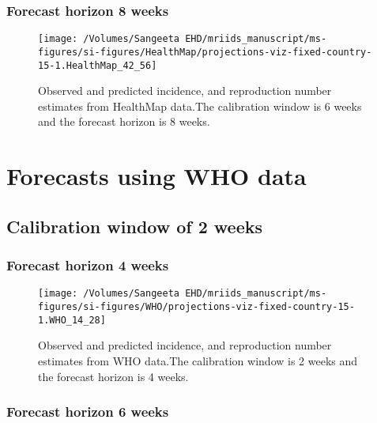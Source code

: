 \documentclass[9pt,twoside,lineno]{pnas-new}
\begin{document}
\hypertarget{forecast-horizon-8-weeks-5}{%
  \subsubsection{Forecast horizon 8 weeks}\label{forecast-horizon-8-weeks-5}}

\begin{figure}

  {\centering \texttt{[image: /Volumes/Sangeeta EHD/mriids\_manuscript/ms-figures/si-figures/HealthMap/projections-viz-fixed-country-15-1.HealthMap\_42\_56]} 

  }

  \caption{Observed and predicted incidence, and reproduction number
    estimates from HealthMap data.The calibration window is 6 weeks
    and the forecast horizon is 8 weeks.}
  \label{fig:hm68}
\end{figure}

\hypertarget{forecasts-using-who-data}{%
  \section{Forecasts using WHO data}\label{forecasts-using-who-data}}

\hypertarget{calibration-window-of-2-weeks-2}{%
  \subsection{Calibration window of 2 weeks}\label{calibration-window-of-2-weeks-2}}

\hypertarget{forecast-horizon-4-weeks-5}{%
  \subsubsection{Forecast horizon 4 weeks}\label{forecast-horizon-4-weeks-5}}

\begin{figure}

  {
    \centering \texttt{[image: /Volumes/Sangeeta EHD/mriids\_manuscript/ms-figures/si-figures/WHO/projections-viz-fixed-country-15-1.WHO\_14\_28]} 

  }

  \caption{Observed and predicted incidence, and reproduction number
    estimates from WHO data.The calibration window is 2 weeks and the
    forecast horizon is 4 weeks.}
  \label{fig:who24}
\end{figure}

\hypertarget{forecast-horizon-6-weeks-6}{%
  \subsubsection{Forecast horizon 6 weeks}\label{forecast-horizon-6-weeks-6}}
\end{document}
